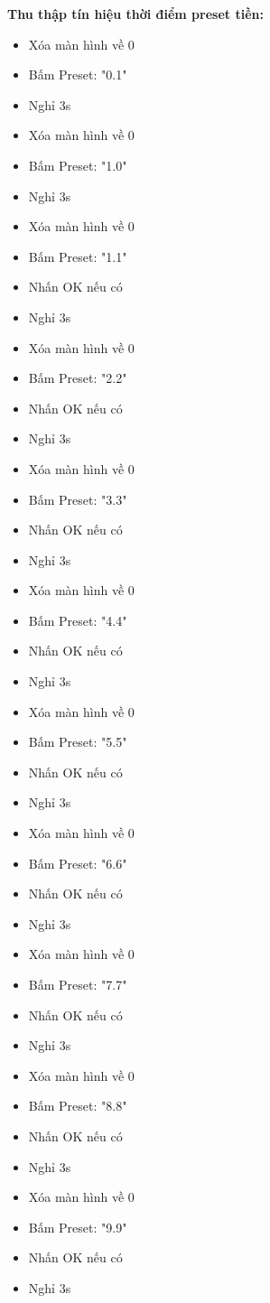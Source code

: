 \textbf{Thu thập tín hiệu thời điểm preset tiền:}
\begin{itemize}
    \item Xóa màn hình về 0
    \item Bấm Preset: "0.1"
    \item Nghỉ 3s
    \item Xóa màn hình về 0
    \item Bấm Preset: "1.0"
    \item Nghỉ 3s
    \item Xóa màn hình về 0
    \item Bấm Preset: "1.1"
    \item Nhấn OK nếu có
    \item Nghỉ 3s
    \item Xóa màn hình về 0
    \item Bấm Preset: "2.2"
    \item Nhấn OK nếu có
    \item Nghỉ 3s
    \item Xóa màn hình về 0
    \item Bấm Preset: "3.3"
    \item Nhấn OK nếu có
    \item Nghỉ 3s
    \item Xóa màn hình về 0
    \item Bấm Preset: "4.4"
    \item Nhấn OK nếu có
    \item Nghỉ 3s
    \item Xóa màn hình về 0
    \item Bấm Preset: "5.5"
    \item Nhấn OK nếu có
    \item Nghỉ 3s
    \item Xóa màn hình về 0
    \item Bấm Preset: "6.6"
    \item Nhấn OK nếu có
    \item Nghỉ 3s
    \item Xóa màn hình về 0
    \item Bấm Preset: "7.7"
    \item Nhấn OK nếu có
    \item Nghỉ 3s
    \item Xóa màn hình về 0
    \item Bấm Preset: "8.8"
    \item Nhấn OK nếu có
    \item Nghỉ 3s
    \item Xóa màn hình về 0
    \item Bấm Preset: "9.9"
    \item Nhấn OK nếu có
    \item Nghỉ 3s
\end{itemize}

